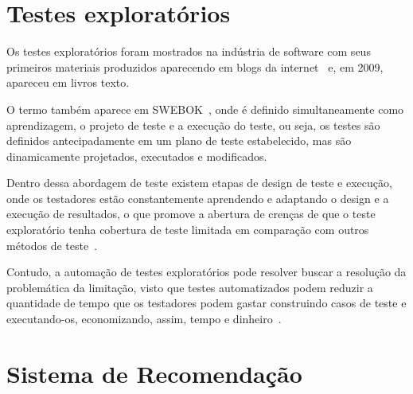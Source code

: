 
\section{Testes exploratórios}

Os testes exploratórios foram mostrados na indústria de software com seus primeiros materiais produzidos 
aparecendo em blogs da internet~\cite{kaner2000testing} e, em 2009, apareceu em livros texto. 

O termo também aparece em SWEBOK~\cite{bourque2014guide}, onde é definido simultaneamente como aprendizagem, o projeto de teste 
e a execução do teste, ou seja, os testes são definidos antecipadamente em um plano de teste estabelecido, mas 
são dinamicamente projetados, executados e modificados.

Dentro dessa abordagem de teste existem etapas de design de teste e execução, onde os testadores estão constantemente aprendendo e 
adaptando o design e a execução de resultados, o que promove a abertura de crenças de que o teste exploratório tenha cobertura de 
teste limitada em comparação com outros métodos de teste~\cite{schaefer2014model}.

Contudo, a automação de testes exploratórios pode resolver buscar a resolução da problemática da limitação, visto que testes 
automatizados podem reduzir a quantidade de tempo que os testadores podem gastar construindo casos de teste e executando-os, 
economizando, assim, tempo e dinheiro~\cite{dustin2009implementing}. 


\section{Sistema de Recomendação}
